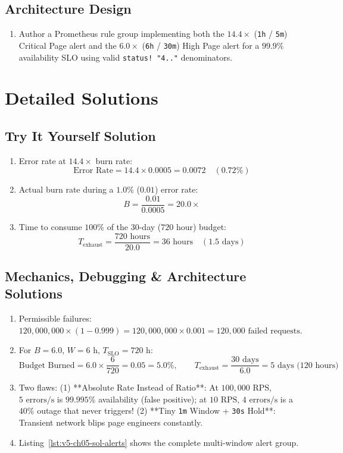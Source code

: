 \subsection*{Architecture Design}
\begin{enumerate}[label=\textbf{Exercise~\thechapter.\arabic*}, leftmargin=*, start=4]
  \item Author a Prometheus rule group implementing both the $14.4\times$ (\texttt{1h} / \texttt{5m}) Critical Page alert and the $6.0\times$ (\texttt{6h} / \texttt{30m}) High Page alert for a $99.9\%$ availability SLO using valid \texttt{status!~"4.."} denominators.
\end{enumerate}

\section{Detailed Solutions}

\subsection*{Try It Yourself Solution}
\begin{enumerate}[leftmargin=18pt]
  \item Error rate at $14.4\times$ burn rate:
  $$\text{Error Rate} = 14.4 \times 0.0005 = 0.0072 \quad (0.72\%)$$
  \item Actual burn rate during a $1.0\%$ ($0.01$) error rate:
  $$B = \frac{0.01}{0.0005} = 20.0\times$$
  \item Time to consume $100\%$ of the 30-day ($720\text{ hour}$) budget:
  $$T_{\text{exhaust}} = \frac{720\text{ hours}}{20.0} = 36\text{ hours} \quad (1.5\text{ days})$$
\end{enumerate}

\subsection*{Mechanics, Debugging \& Architecture Solutions}
\begin{enumerate}[label=\textbf{Solution~\thechapter.\arabic*}, leftmargin=*]
  \item Permissible failures: $120,000,000 \times (1 - 0.999) = 120,000,000 \times 0.001 = 120,000\text{ failed requests}$.
  \item For $B = 6.0$, $W = 6\text{ h}$, $T_{\text{SLO}} = 720\text{ h}$:
  $$\text{Budget Burned} = 6.0 \times \frac{6}{720} = 0.05 = 5.0\%, \qquad T_{\text{exhaust}} = \frac{30\text{ days}}{6.0} = 5\text{ days (120 hours)}$$
  \item Two flaws: (1) **Absolute Rate Instead of Ratio**: At $100,000\text{ RPS}$, $5\text{ errors/s}$ is $99.995\%$ availability (false positive); at $10\text{ RPS}$, $4\text{ errors/s}$ is a $40\%$ outage that never triggers! (2) **Tiny \texttt{1m} Window + \texttt{30s} Hold**: Transient network blips page engineers constantly.
  \item Listing~\ref{lst:v5-ch05-sol-alerts} shows the complete multi-window alert group.
\end{enumerate}

